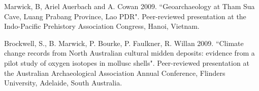{{\ind Marwick, B, Ariel Auerbach and A. Cowan 2009. ``Geoarchaeology at Tham Sua Cave, Luang Prabang Province, Lao PDR". Peer-reviewed presentation at the Indo-Pacific Prehistory Association Congress, Hanoi, Vietnam.

\ind Brockwell, S., B. Marwick, P. Bourke, P. Faulkner, R. Willan 2009. ``Climate change records from North Australian cultural midden deposits: evidence from a pilot study of oxygen isotopes in mollusc shells". Peer-reviewed presentation  at the Australian Archaeological Association Annual Conference, Flinders University, Adelaide, South Australia.






 \bigskip



}}

